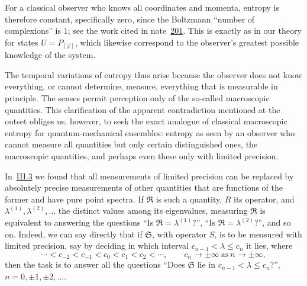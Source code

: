 \documentclass[fontsize=13pt,twoside,openany,headings=normal,parskip=false,bookmarkpackage=false,DIV=calc]{scrbook}
\begin{document}
For a classical observer who knows all coordinates and momenta, entropy is therefore constant, specifically zero, since the Boltzmann ``number of complexions'' is $1$; see the work cited in note~\hyperlink{note-201}{201}. This is exactly as in our theory for states $U=P_{[\varphi]}$, which likewise correspond to the observer's greatest possible knowledge of the system.

The temporal variations of entropy thus arise because the observer does not know everything, or cannot determine, measure, everything that is measurable in principle. The senses permit perception only of the so-called macroscopic quantities. This clarification of the apparent contradiction mentioned at the outset obliges us, however, to seek the exact analogue of classical macroscopic entropy for quantum-mechanical ensembles: entropy as seen by an observer who cannot measure all quantities but only certain distinguished ones, the macroscopic quantities, and perhaps even these only with limited precision.

In~\hyperref[sec:III.3]{III.3} we found that all measurements of limited precision can be replaced by absolutely precise measurements of other quantities that are functions of the former and have pure point spectra. If $\mathfrak R$ is such a quantity, $R$ its operator, and $\lambda^{(1)},\lambda^{(2)},\ldots$ the distinct values among its eigenvalues, measuring $\mathfrak R$ is equivalent to answering the questions ``Is
\hypertarget{origpage-214}{}%
$\mathfrak R=\lambda^{(1)}$?'', ``Is $\mathfrak R=\lambda^{(2)}$?'', and so on. Indeed, we can say directly that if $\mathfrak S$, with operator $S$, is to be measured with limited precision, say by deciding in which interval $c_{n-1}<\lambda\leq c_n$ it lies, where
\[
\cdots<c_{-2}<c_{-1}<c_0<c_1<c_2<\cdots,
\qquad c_n\to\pm\infty\ \text{as}\ n\to\pm\infty,
\]
then the task is to answer all the questions ``Does $\mathfrak S$ lie in $c_{n-1}<\lambda\leq c_n$?'', $n=0,\pm1,\pm2,\ldots$.
\end{document}
